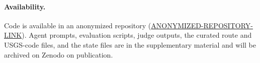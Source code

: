 \paragraph{Availability.}
Code is available in an anonymized repository (\url{ANONYMIZED-REPOSITORY-LINK}). Agent prompts, evaluation scripts, judge outputs, the curated route and USGS-code files, and the \tool{} state files are in the supplementary material and will be archived on Zenodo on publication.
